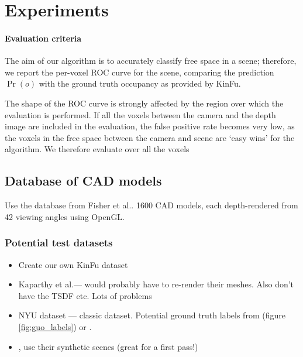 \documentclass[10pt,twocolumn,letterpaper]{article}
\makeatletter
\newcommand*{\ea}{et al.\@\xspace}
\makeatother
\begin{document}
\section{Experiments}

\paragraph{Evaluation criteria}
The aim of our algorithm is to accurately classify free space in a scene; therefore, we report the per-voxel ROC curve for the scene, comparing the prediction $\Pr(o)$ with the ground truth occupancy as provided by KinFu.

The shape of the ROC curve is strongly affected by the region over which the evaluation is performed.
If all the voxels between the camera and the depth image are included in the evaluation, the false positive rate becomes very low, as the voxels in the free space between the camera and scene are `easy wins' for the algorithm. We therefore evaluate over all the voxels 




\subsection{Database of CAD models}
Use the database from Fisher \ea \cite{fisher-siggraphasia-2012}.
1600 CAD models, each depth-rendered from 42 viewing angles using OpenGL.

\subsubsection{Potential test datasets}
\begin{itemize}
\item Create our own KinFu dataset
\item Kaparthy \ea --- would probably have to re-render their meshes.
Also don't have the TSDF etc. Lots of problems
\item NYU dataset --- classic dataset. Potential ground truth labels from \cite{guo-iccv-2013} (figure \ref{fig:guo_labels}) or \cite{kim-iccv-2013}.
\item \cite{fisher-siggraphasia-2012}, use their synthetic scenes (great for a first pass!)
\end{itemize}
\end{document}
